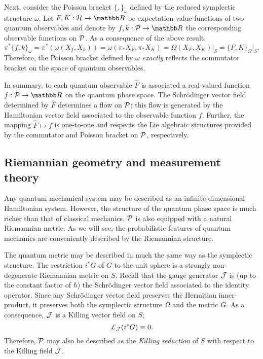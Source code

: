 \documentclass[12pt,aps,eqsecnum,tighten,nofootinbib]{revtex4-2}
\def\be{\begin{equation}}
\def\ee{\end{equation}}
\def\H{{\cal H}}
\def\P{{\cal P}}
\def\w{\omega}
\def\W{\Omega}
\def\J{{\cal J}}
\newcommand{\lie}[1]{{\pounds}_{#1}}
\newcommand{\hvf}[1]{{X_{#1}}}
\def\R{\mathbb R}
\begin{document}
Next, consider the Poisson bracket $\{ , \}_\w$ defined by the reduced
symplectic structure $\w$.  Let $F, K :\H \rightarrow \R$ be
expectation value functions of two quantum observables and denote by
$f,k:\P \rightarrow \R$ the corresponding observable functions on
$\P$.  As a consequence of the above result,
%
\be \label{pb_on_P}
\pi^*\{ f, k \}_\w = \pi^*( \w( \hvf{f}, \hvf{k} ) )
= \w( \pi_*\hvf{F}, \pi_*\hvf{K} )
= \W( \hvf{F}, \hvf{K} )\big|_S
= \{ F, K \}_\W\big|_S.
\ee
%
Therefore, the Poisson bracket defined by $\w$ {\em exactly} reflects
the commutator bracket on the space of quantum observables.

In summary, to each quantum observable $\hat{F}$ is associated a
real-valued function $f:\P \rightarrow \R$ on the quantum phase space.
The Schr\"odinger vector field determined by $\hat{F}$ determines a
flow on $\P$; this flow is generated by the Hamiltonian vector field
associated to the observable function $f$.  Further, the mapping
$\hat{F} \mapsto f$ is one-to-one and respects the Lie algebraic
structures provided by the commutator and Poisson bracket on $\P$,
respectively.


\subsection{Riemannian geometry and measurement theory}
\label{sec2.C}

Any quantum mechanical system may be described as an
infinite-dimensional Hamiltonian system.  However, the structure of
the quantum phase space is much richer than that of classical
mechanics.  $\P$ is also equipped with a natural Riemannian metric.
As we will see, the probabilistic features of quantum mechanics are
conveniently described by the Riemannian structure.

The quantum metric may be described in much the same way as the
symplectic structure.  The restriction $i^*G$ of $G$ to the unit
sphere is a strongly non-degenerate Riemannian metric on $S$.  Recall
that the gauge generator $\J$ is (up to the constant factor of
$\hbar$) the Schr\"odinger vector field associated to the identity
operator.  Since any Schr\"odinger vector field preserves the
Hermitian inner-product, it preserves both the symplectic structure
$\W$ and the metric $G$.  As a consequence, $\J$ is a Killing vector
field on $S$;
%
\be
	\lie{\J} (i^*G) \equiv 0.
\ee
%
Therefore, $\P$ may also be described as the {\em Killing
reduction}\cite{geroch} of $S$ with respect to the Killing field $\J$.
\end{document}
